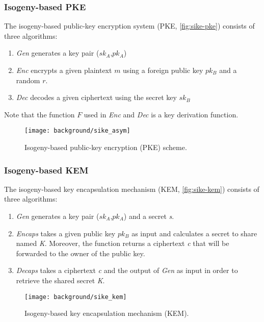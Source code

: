 \subsubsection{Isogeny-based \gls{PKE}}
The isogeny-based public-key encryption system (\gls{PKE}, \autoref{fig:sike-pke}) consists of three algorithms:
\begin{enumerate}
\item \textit{Gen} generates a key pair ($sk_A$,$pk_A$)
\item \textit{\gls{Enc}} encrypts a given plaintext $m$ using a foreign public key $pk_B$ and a random $r$.
\item \textit{\gls{Dec}} decodes a given ciphertext using the secret key $sk_B$
\end{enumerate}
Note that the function $F$ used in \textit{\gls{Enc}} and \textit{\gls{Dec}} is a key derivation function.

\begin{figure}[H]
  \centering
  \texttt{[image: background/sike\_asym]}
  \caption[Isogeny-based \gls{PKE}]
  {Isogeny-based public-key encryption (\gls{PKE}) scheme.} \label{fig:sike-pke}
\end{figure}

\subsubsection{Isogeny-based \gls{KEM}}
The isogeny-based key encapsulation mechanism (\gls{KEM}, \autoref{fig:sike-kem}) consists of three algorithms:
\begin{enumerate}
\item \textit{Gen} generates a key pair ($sk_A$,$pk_A$) and a secret \textit{s}.
\item \textit{Encaps} takes a given public key $pk_B$ as input and calculates a secret to share named \textit{K}. Moreover, the function returns a ciphertext \textit{c} that will be forwarded to the owner of the public key.
\item \textit{Decaps} takes a ciphertext \textit{c} and the output of \textit{Gen} as input in order to retrieve the shared secret \textit{K}.
\end{enumerate}
\begin{figure}[H]
  \centering
  \texttt{[image: background/sike\_kem]}
  \caption[Isogeny-based \gls{KEM}]
  {Isogeny-based key encapsulation mechanism (\gls{KEM}).} \label{fig:sike-kem}
\end{figure}

